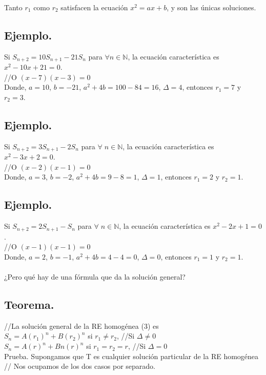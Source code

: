 \documentclass{article}
\begin{document}
Tanto $r_1$ como $r_2$ satisfacen la ecuación $x^2 = ax + b$, y son las únicas soluciones.

\subsection{Ejemplo.}
Si $S_{n+2} = 10S_{n+1} - 21S_n$ para $\forall n \in \mathbb{N}$, la ecuación característica es $x^2 - 10x +21 = 0$.\\
//O $(x-7)(x-3)=0$\\
Donde, $a=10$, $b=-21$, $a^2+4b=100-84=16$, $\Delta = 4$, entonces $r_1 = 7$ y $r_2 = 3$.

\subsection{Ejemplo.}
Si $S_{n+2} = 3S_{n+1}-2S_{n}$ para $\forall \; n \in \mathbb{N}$, la ecuación característica es $x^2-3x+2=0$.\\
//O $(x-2)(x-1)=0$\\
Donde, $a=3$, $b=-2$, $a^2+4b=9-8=1$, $\Delta = 1$, entonces $r_1=2$ y $r_2=1$.


\subsection{Ejemplo.}
Si $S_{n+2} = 2S_{n+1}- S_{n}$ para $\forall \; n \in \mathbb{N}$, la ecuación característica es $x^2-2x+1=0$.\\
//O $(x-1)(x-1)=0$\\
Donde, $a=2$, $b=-1$, $a^2+4b=4-4=0$, $\Delta = 0$, entonces $r_1=1$ y $r_2=1$.\\\\

¿Pero qué hay de una fórmula que da la solución general?

\subsection{Teorema.}
//La solución general de la RE homogénea (3) es\\

$S_n = A(r_1)^n + B(r_2)^n$ si $r_1 \neq r_2$,  //Si $\Delta \neq 0$\\
$S_n = A(r)^n + Bn(r)^n$ si $r_1 = r_2 = r$, //Si $\Delta = 0$\\

Prueba. Supongamos que T es cualquier solución particular de la RE homogénea\\
// Nos ocupamos de los dos casos por separado.\\
\end{document}
